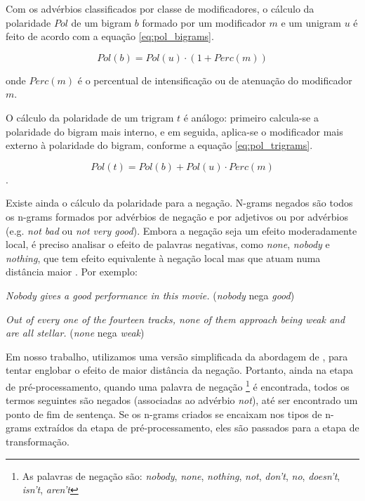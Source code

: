 \documentclass[template.tex]{subfiles}
\begin{document}
Com os advérbios classificados por classe de modificadores, o cálculo da polaridade $Pol$ de um bigram $b$ formado por um modificador $m$ e um unigram $u$ é feito de acordo com a equação \ref{eq:pol_bigrams}.

\begin{equation}
Pol(b) = Pol(u) \cdot (1 + Perc(m))
\label{eq:pol_bigrams}
\end{equation}

onde $Perc(m)$ é o percentual de intensificação ou de atenuação do modificador $m$. 

O cálculo da polaridade de um trigram $t$ é análogo: primeiro calcula-se a polaridade do bigram mais interno, e em seguida, aplica-se o modificador mais externo à polaridade do bigram, conforme a equação \ref{eq:pol_trigrams}.

\begin{equation} 
Pol(t) = Pol(b) + Pol(u) \cdot Perc(m)
\label{eq:pol_trigrams}
\end{equation}.

Existe ainda o cálculo da polaridade para a negação. N-grams negados são todos os n-grams formados por advérbios de negação e por adjetivos ou por advérbios (e.g. \textit{not bad} ou \textit{not very good}). Embora a negação seja um efeito moderadamente local, é preciso analisar o efeito de palavras negativas, como \textit{none}, \textit{nobody} e \textit{nothing}, que tem efeito equivalente à negação local mas que atuam numa distância maior \cite{taboada2011lexicon}. Por exemplo:

\begin{example}
\textit{Nobody gives a good performance in this movie.} (\textit{nobody} nega \textit{good})
\label{ex:far_neg_1}
\end{example}

\begin{example}
\textit{Out of every one of the fourteen tracks, none of them approach being weak and are all stellar.} (\textit{none} nega \textit{weak})
\label{ex:far_neg_2}
\end{example}

Em nosso trabalho, utilizamos uma versão simplificada da abordagem de , para tentar englobar o efeito de maior distância da negação. Portanto, ainda na etapa de pré-processamento, quando uma palavra de negação \footnote{As palavras de negação são: \textit{nobody}, \textit{none}, \textit{nothing}, \textit{not}, \textit{don't}, \textit{no}, \textit{doesn't}, \textit{isn't}, \textit{aren't}} é encontrada, todos os termos seguintes são negados (associadas ao advérbio \textit{not}), até ser encontrado um ponto de fim de sentença. Se os n-grams criados se encaixam nos tipos de n-grams extraídos da etapa de pré-processamento, eles são passados para a etapa de transformação. 
\end{document}
